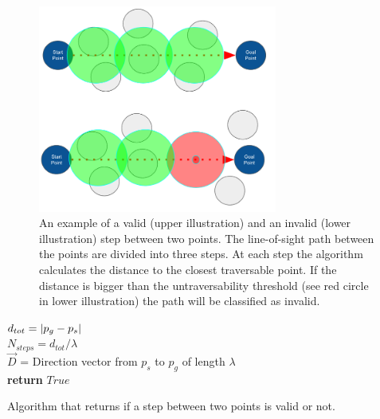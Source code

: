 \begin{figure}
    \centering
    \includegraphics[width=0.7\textwidth]{figures/isvalidstep.png}
    \caption{An example of a valid (upper illustration) and an invalid (lower illustration) step between two points. The line-of-sight path between the points are divided into three steps. At each step the algorithm calculates the distance to the closest traversable point. If the distance is bigger than the untraversability threshold (see red circle in lower illustration) the path will be classified as invalid.}
    \label{fig:isvalidstep}
\end{figure}

\begin{algorithm}[H]
\SetAlgoLined
{}
$d_{tot} = \abs{p_{g} - p_{s}}$ \\
$N_{steps} = d_{tot} / \lambda$ \\
$\vec{D}$ = \textup{Direction vector from $p_s$ to $p_g$ of length $\lambda$ } \\
\textup{\textbf{return} $True$}
 \caption{Algorithm that returns if a step between two points is valid or not.}
 \label{alg:is_valid_step}
\end{algorithm}

